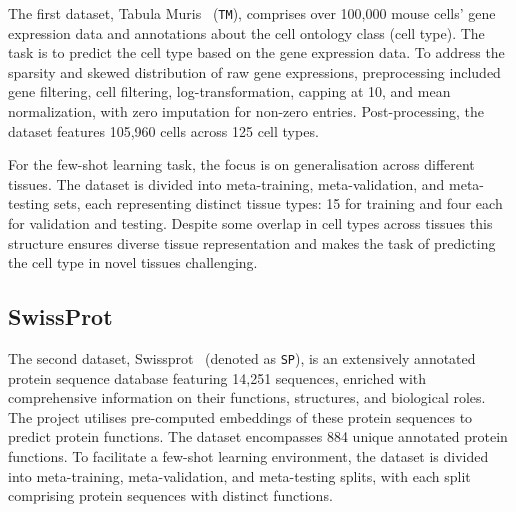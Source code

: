 \documentclass{article}
\begin{document}
The first dataset, Tabula Muris~\cite{tabula2018} (\texttt{TM}), comprises over 100,000 mouse cells' gene expression data and annotations about the cell ontology class (cell type). The task is to predict the cell type based on the gene expression data. To address the sparsity and skewed distribution of raw gene expressions, preprocessing included gene filtering, cell filtering, log-transformation, capping at 10, and mean normalization, with zero imputation for non-zero entries. Post-processing, the dataset features 105,960 cells across 125 cell types.

For the few-shot learning task, the focus is on generalisation across different tissues. The dataset is divided into meta-training, meta-validation, and meta-testing sets, each representing distinct tissue types: 15 for training and four each for validation and testing. Despite some overlap in cell types across tissues this structure ensures diverse tissue representation and makes the task of predicting the cell type in novel tissues challenging.



\subsection{SwissProt}

The second dataset, Swissprot~\cite{uniprot2019} (denoted as \texttt{SP}), is an extensively annotated protein sequence database featuring 14,251 sequences, enriched with comprehensive information on their functions, structures, and biological roles. The project utilises pre-computed embeddings of these protein sequences to predict protein functions. The dataset encompasses 884 unique annotated protein functions. To facilitate a few-shot learning environment, the dataset is divided into meta-training, meta-validation, and meta-testing splits, with each split comprising protein sequences with distinct functions.


\end{document}
